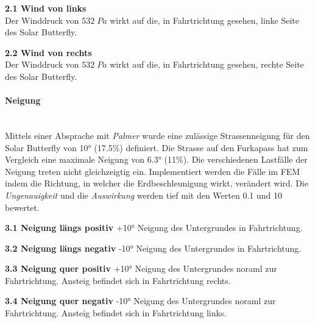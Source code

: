   \begin{description}
    \item \textbf{2.1 Wind von links}\\ Der Winddruck von $532  \; Pa$ wirkt auf die, in Fahrtrichtung gesehen, linke Seite des Solar Butterfly.
    \item \textbf{2.2 Wind von rechts}\\ Der Winddruck von $532 \; Pa$ wirkt auf die, in Fahrtrichtung gesehen, rechte Seite des Solar Butterfly.
  \end{description}

  \paragraph{Neigung}\mbox{}\\
  Mittels einer Absprache mit \emph{Palmer} wurde eine zulässige Strassenneigung für den Solar Butterfly von 10° (17.5\%) definiert. Die Strasse auf den Furkapass hat zum Vergleich eine maximale Neigung von 6.3° (11\%). Die verschiedenen Lastfälle der Neigung treten nicht gleichzeigtig ein. Implementiert werden die Fälle im FEM indem die Richtung, in welcher die Erdbeschleunigung wirkt, verändert wird. Die \emph{Ungenauigkeit} und die \emph{Auswirkung} werden tief mit den Werten 0.1  und 10 bewertet.

  \begin{description}
    \item \textbf{3.1 Neigung längs positiv} +10° Neigung des Untergrundes in Fahrtrichtung.
    \item \textbf{3.2 Neigung längs negativ} -10° Neigung des Untergrundes in Fahrtrichtung.
    \item \textbf{3.3 Neigung quer positiv} +10° Neigung des Untergrundes noraml zur Fahrtrichtung. Ansteig befindet sich in Fahrtrichtung rechts.
    \item \textbf{3.4 Neigung quer negativ} -10° Neigung des Untergrundes noraml zur Fahrtrichtung. Ansteig befindet sich in Fahrtrichtung links.
  \end{description}


